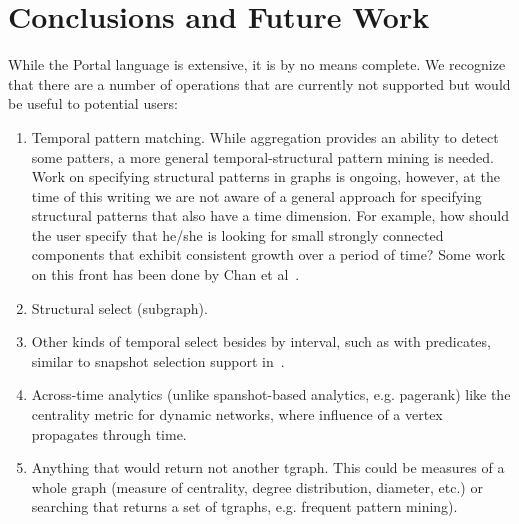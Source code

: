 \section{Conclusions and Future Work}
\label{sec:conc}

While the Portal language is extensive, it is by no means complete. We
recognize that there are a number of operations that are currently not
supported but would be useful to potential users:

\begin{enumerate}
\item Temporal pattern matching.  While aggregation provides an
  ability to detect some patters, a more general temporal-structural
  pattern mining is needed.  Work on specifying structural patterns in
  graphs is ongoing, however, at the time of this writing we are not
  aware of a general approach for specifying structural patterns that
  also have a time dimension.  For example, how should the user
  specify that he/she is looking for small strongly connected
  components that exhibit consistent growth over a period of time?
  Some work on this front has been done by Chan et
  al~\cite{Chan2008,Kan2009}.
\item Structural select (subgraph).  
\item Other kinds of temporal select besides by interval, such as with
  predicates, similar to snapshot selection support
  in~\cite{Khurana2013}. 
\item Across-time analytics (unlike spanshot-based analytics,
  e.g. pagerank) like the centrality metric for dynamic networks,
  where influence of a vertex propagates through time.
\item Anything that would return not another tgraph.  This could be
  measures of a whole graph (measure of centrality, degree
  distribution, diameter, etc.) or searching that returns a set of tgraphs,
  e.g. frequent pattern mining).
\end{enumerate}
